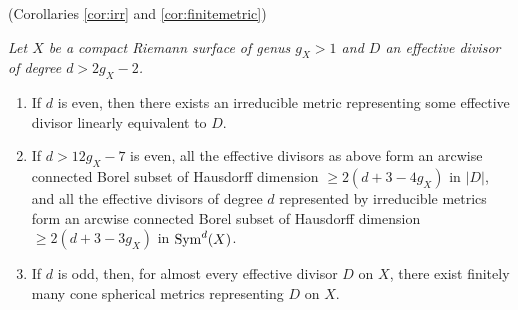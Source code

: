 \documentclass[12pt]{article}
\begin{document}
 (Corollaries \ref{cor:irr} and \ref{cor:finitemetric})
{\it Let $X$ be a compact Riemann surface of genus $g_X>1$ and $D$ an effective divisor of degree $d>2g_X-2$.
\begin{enumerate}

\item If $d$ is even, then there exists an irreducible metric representing some effective divisor linearly equivalent to $D$.

\item If $d>12g_X-7$ is even, all the effective divisors as above form an arcwise connected Borel subset of Hausdorff dimension $\geq 2(d+3-4g_X)$ in $|D|$, and all the effective divisors of degree $d$ represented by irreducible metrics form an arcwise connected Borel subset of Hausdorff dimension $\geq 2(d+3-3g_X)$ in ${\rm Sym}^d(X)$.

\item If $d$ is odd, then, for almost every effective divisor $D$ on $X$, there exist finitely many cone spherical metrics representing $D$ on $X$.
\end{enumerate}}
\end{document}
